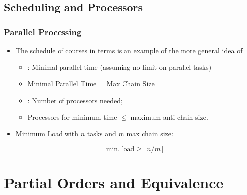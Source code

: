 \documentclass{beamer}
\begin{document}
\subsection{Scheduling and Processors}

\begin{frame}
  \frametitle{Parallel Processing}

  {\larger
    \begin{itemize}
    \item The schedule of courses in terms is an example of the more general idea of 

      {\large
        \begin{itemize}
        \item {}: Minimal parallel
          time (assuming no limit on parallel tasks)
        \item Minimal Parallel Time = Max Chain Size
        \item {}: Number of processors
          needed;
        \item Processors for minimum time $\leq$ maximum anti-chain
          size.
        \end{itemize}
      }

      \vfill

    \item Minimum Load with $n$ tasks and $m$ max chain size:

      \begin{equation}
        \text{min. load} \geq \lceil n/m  \rceil
      \end{equation}
    \end{itemize}
  }

\end{frame}

\section{Partial Orders and Equivalence}
\end{document}
